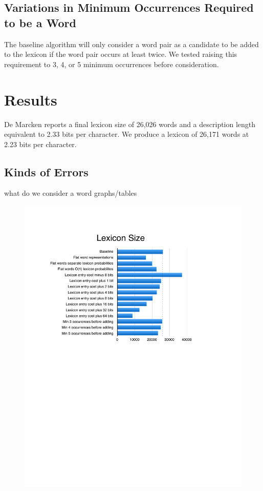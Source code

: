 \documentclass[11pt, oneside, fleqn]{article}
\begin{document}
	\subsection*{Variations in Minimum Occurrences Required to be a Word}
	
	The baseline algorithm will only consider a word pair as a candidate to be added to the lexicon if the word pair occurs at least twice. We tested raising this requirement to 3, 4, or 5 minimum occurrences before consideration.
 
   \section*{Results}
   
   De Marcken reports a final lexicon size of 26,026 words and a description length equivalent to 2.33 bits per character. We produce a lexicon of 26,171 words at 2.23 bits per character.
   
   \subsection*{Kinds of Errors}

  what do we consider a word
  graphs/tables
 
  \begin{figure}[h]
  \includegraphics{./figure/lexicon_size.pdf}
  \end{figure}
\end{document}
